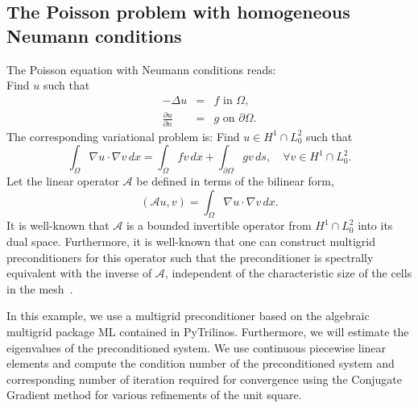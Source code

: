 \subsection{The Poisson problem with homogeneous Neumann conditions}
The Poisson equation with Neumann conditions reads: \\ 
Find $u$ such that
\begin{eqnarray}
-\Delta u &= &f \mbox{ in } \Omega,  \\ 
    \frac{\partial u}{\partial n} &=&  g \mbox{ on } \partial \Omega . 
\end{eqnarray}
The corresponding variational problem is:  Find $u\in H^1 \cap L^2_0$ such that 
\[
\int_\Omega \nabla u \cdot \nabla v \, dx = \int_\Omega f v \, dx + \int_{\partial \Omega} g v \, ds, \quad\forall v \in H^1 \cap L^2_0 .      
\]
Let the linear operator $\mathcal{A}$ be defined in terms of the  bilinear form,  
\[
(\mathcal{A} u, v) =  \int_\Omega \nabla u \cdot \nabla v \, dx.  
\]
It is well-known that 
$\mathcal{A}$ is a bounded invertible operator from $H^1 \cap L^2_0$ into its dual space. 
Furthermore, it is well-known that one can construct multigrid preconditioners for this operator
such that the preconditioner is spectrally equivalent with the inverse of $\mathcal{A}$, independent of the
characteristic size of the cells in the mesh~\cite{Bramble1993,Hackbusch, TOS2001}. 

In this example, we use a multigrid preconditioner based on the algebraic multigrid
package ML contained in PyTrilinos. Furthermore, we will estimate the eigenvalues
of the preconditioned system. We use continuous piecewise linear elements and
compute the condition number of the preconditioned system and corresponding 
number of iteration required for convergence using the Conjugate Gradient method for various refinements of the unit square. 


